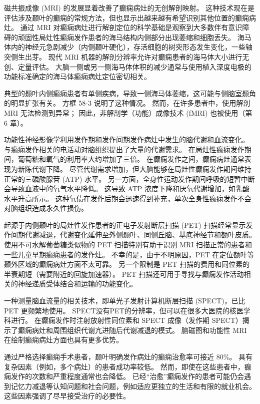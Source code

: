 磁共振成像 (MRI) 的发展显着改善了癫痫病灶的无创解剖映射。 这种技术现在是评估涉及颞叶的癫痫的常规方法，但也显示出越来越有希望识别其他位置的癫痫病灶。 通过 MRI 对癫痫病灶进行解剖定位的科学基础是观察到大多数伴有意识障碍的顽固性局灶性癫痫发作患者的海马结构内侧部分出现萎缩和细胞丢失。 海马体内的神经元急剧减少（内侧颞叶硬化），存活细胞的树突形态发生变化，一些轴突侧生出芽。 现代 MRI 机器的解剖分辨率允许对癫痫患者的海马体大小进行无创、定量评估。 大脑一侧或另一侧海马体体积的减少通常与使用植入深度电极的功能标准确定的海马体癫痫病灶定位密切相关。

典型的颞叶内侧癫痫患者有单侧疾病，导致一侧海马体萎缩，这可能与侧脑室颞角的明显扩张有关。 方框 58-3 说明了这种情况。 然而，在许多患者中，使用解剖 MRI 无法检测到异常； 因此，非解剖学（功能）成像技术 (fMRI) 也被使用（第 6 章）。

功能性神经影像学利用发作期和发作间期发作病灶中发生的脑代谢和血流变化。 与癫痫发作相关的电活动对脑组织提出了大量的代谢需求。 在局灶性癫痫发作期间，葡萄糖和氧气的利用率大约增加了三倍。 在癫痫发作之间，癫痫病灶通常表现为新陈代谢下降。 尽管代谢需求增加，但大脑能够在局灶性癫痫发作期间维持正常的三磷酸腺苷 (ATP) 水平。 另一方面，全身性运动发作期间呼吸的短暂中断会导致血液中的氧气水平降低。 这导致 ATP 浓度下降和厌氧代谢增加，如乳酸水平升高所示。 这种氧债在发作后期会迅速得到补充，单次全身性癫痫发作不会对脑组织造成永久性损伤。

起源于内侧颞叶的局灶性发作患者的正电子发射断层扫描 (PET) 扫描经常显示发作间期代谢减退，代谢变化延伸至外侧颞叶、同侧丘脑、基底神经节和额叶皮质。 使用不可水解葡萄糖类似物的 PET 扫描特别有助于识别 MRI 扫描正常的患者和一些儿童早期癫痫患者的发作灶。 不幸的是，由于不明原因，PET 在定位额叶等颞外区域的癫痫病灶方面不太可靠。 另一个限制是 PET 扫描的费用和同位素的半衰期短（需要附近的回旋加速器）。 PET 扫描还可用于寻找与癫痫发作活动相关的神经递质受体结合和运输的功能变化。

一种测量脑血流量的相关技术，即单光子发射计算机断层扫描 (SPECT)，已比 PET 更频繁地使用。 SPECT没有PET的分辨率，但可以在很多大医院的核医学科进行。 在癫痫发作时注射放射性同位素和 SPECT 成像（发作期 SPECT）揭示了癫痫病灶和周围组织代谢亢进随后代谢减退的模式。 脑磁图和功能性 MRI 在绘制癫痫病灶方面也具有更多优势。

通过严格选择癫痫手术患者，颞叶明确发作病灶的癫痫治愈率可接近 80\%。 具有复杂因素（例如，多个病灶）的患者成功率较低。 然而，即使在这些患者中，癫痫发作的次数和严重程度通常也会降低。 已经“治愈”癫痫发作的患者可能仍会遇到记忆力减退等认知问题和社会问题，例如适应更独立的生活和有限的就业机会。 这些因素强调了尽早接受治疗的必要性。


